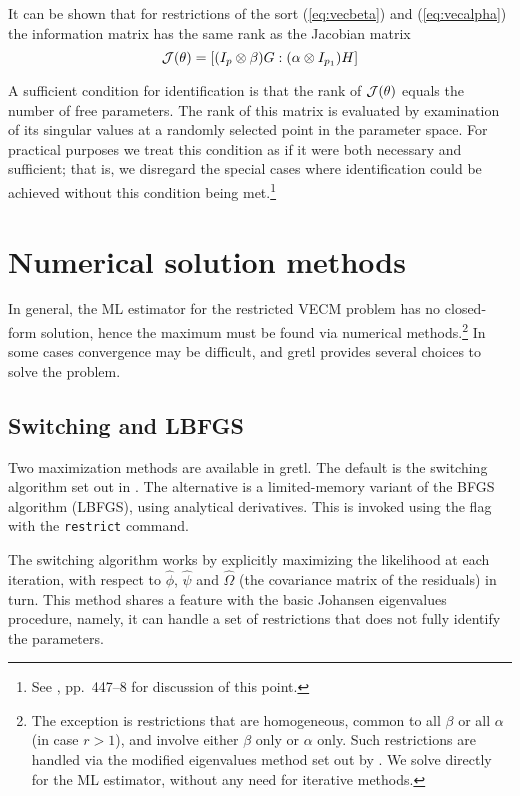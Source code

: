 It can be shown that for restrictions of the sort (\ref{eq:vecbeta})
and (\ref{eq:vecalpha}) the information matrix has the same rank as the
Jacobian matrix
%
\[
{\cal J}(\theta) = \left[ (I_p \otimes \beta) G : 
                   (\alpha \otimes I_{p_1}) H \right]
\]

A sufficient condition for identification is that the rank of ${\cal
  J}(\theta)$ equals the number of free parameters.  The rank of this
matrix is evaluated by examination of its singular values at a
randomly selected point in the parameter space.  For practical
purposes we treat this condition as if it were both necessary and
sufficient; that is, we disregard the special cases where
identification could be achieved without this condition being
met.\footnote{See \cite{boswijk-doornik04}, pp.\ 447--8 for
  discussion of this point.}


\section{Numerical solution methods}
\label{sec:vecm-opt}

In general, the ML estimator for the restricted VECM problem has no
closed-form solution, hence the maximum must be found via numerical
methods.\footnote{The exception is restrictions that are homogeneous,
  common to all $\beta$ or all $\alpha$ (in case $r>1$), and involve
  either $\beta$ only or $\alpha$ only.  Such restrictions are handled
  via the modified eigenvalues method set out by \cite{johansen95}.
  We solve directly for the ML estimator, without any need for
  iterative methods.}  In some cases convergence may be difficult, and
gretl provides several choices to solve the problem.

\subsection{Switching and LBFGS}
\label{sec:vecm-algorithms}

Two maximization methods are available in gretl. The default is
the switching algorithm set out in \cite{boswijk-doornik04}.  The
alternative is a limited-memory variant of the BFGS algorithm (LBFGS),
using analytical derivatives.  This is invoked using the
 flag with the \texttt{restrict} command.

The switching algorithm works by explicitly maximizing the likelihood
at each iteration, with respect to $\hat{\phi}$, $\hat{\psi}$ and
$\hat{\Omega}$ (the covariance matrix of the residuals) in turn.  This
method shares a feature with the basic Johansen eigenvalues procedure,
namely, it can handle a set of restrictions that does not fully
identify the parameters.

